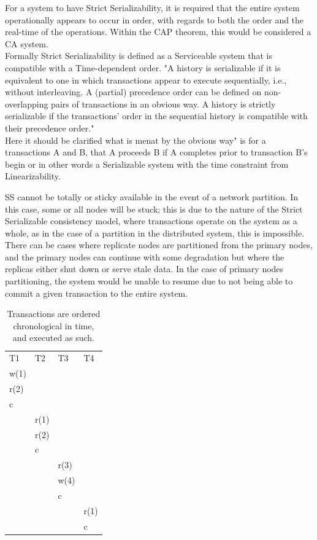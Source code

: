 \documentclass[a4paper,10pt,titlepage]{report}
\begin{document}
    For a system to have Strict Serializability, it is required that the entire system operationally appears to occur in order, with regards to both the order and the real-time of the operations. Within the CAP theorem, this would be considered a CA system.\\
    \vspace{5mm}
    Formally Strict Serializability is defined as a Serviceable system that is compatible with a Time-dependent order.
    "A history is serializable if it is equivalent to one in which transactions appear to execute sequentially, i.e., without interleaving. A (partial) precedence order can be defined on non-overlapping pairs of transactions in an obvious way. A history is strictly serializable if the transactions' order in the sequential history is compatible with their precedence order." \cite{Herlihy1990Linearizability}\\
    \vspace{5mm}
    Here it should be clarified what is menat by the obvious way" is for a transactions A and B, that A proceeds B if A completes prior to transaction B's begin or in other words a Serializable system with the time constraint from Linearizability.

    SS cannot be totally or sticky available in the event of a network partition. In this case, some or all nodes will be stuck; this is due to the nature of the Strict Serializable consistency model, where transactions operate on the system as a whole, as in the case of a partition in the distributed system, this is impossible. There can be cases where replicate nodes are partitioned from the primary nodes, and the primary nodes can continue with some degradation but where the replicas either shut down or serve stale data. In the case of primary nodes partitioning, the system would be unable to resume due to not being able to commit a given transaction to the entire system.


    \begin{table}[h]
        \begin{tabular}{l|l|l|l}
            T1   & T2   & T3   & T4   \\
            w(1) &      &      &      \\
            r(2) &      &      &      \\
            c    &      &      &      \\
            & r(1) &      &      \\
            & r(2) &      &      \\
            & c    &      &      \\
            &      & r(3) &      \\
            &      & w(4) &      \\
            &      & c    &      \\
            &      &      & r(1) \\
            &      &      & c
        \end{tabular}
        \caption{Transactions are ordered chronological in time, and executed as such.}

    \end{table}
\end{document}
